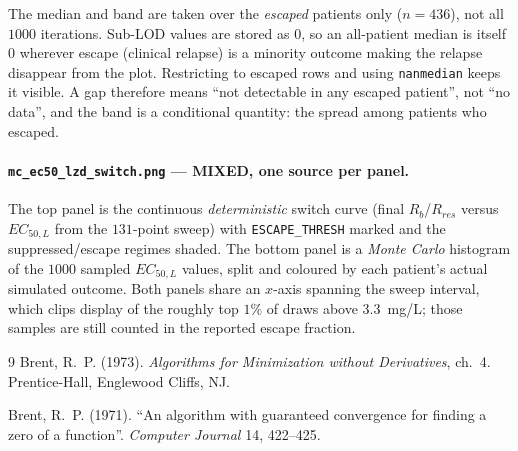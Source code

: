 \documentclass[11pt]{article}
\begin{document}
The median and band are taken over the \emph{escaped} patients only
($n = 436$), not all $1000$ iterations. Sub-LOD values are stored as $0$,
so an all-patient median is itself $0$ wherever escape (clinical relapse) is a minority outcome making the relapse disappear from the plot. Restricting to escaped rows and
using \texttt{nanmedian} keeps it visible. A gap therefore means ``not
detectable in any escaped patient'', not ``no data'', and the band is a
conditional quantity: the spread among patients who escaped.

\paragraph{\texttt{mc\_ec50\_lzd\_switch.png} --- MIXED, one source per
panel.} The top panel is the continuous \emph{deterministic} switch curve
(final $R_b$/$R_{res}$ versus $EC_{50,L}$ from the $131$-point sweep) with
\texttt{ESCAPE\_THRESH} marked and the suppressed/escape regimes shaded.
The bottom panel is a \emph{Monte Carlo} histogram of the $1000$ sampled
$EC_{50,L}$ values, split and coloured by each patient's actual simulated
outcome. Both panels share an $x$-axis spanning the sweep interval, which
clips display of the roughly top $1\%$ of draws above $3.3$~mg/L; those
samples are still counted in the reported escape fraction.

\begin{thebibliography}{9}
Brent, R.~P. (1973). \emph{Algorithms for Minimization without
Derivatives}, ch.~4. Prentice-Hall, Englewood Cliffs, NJ.

Brent, R.~P. (1971). ``An algorithm with guaranteed convergence for
finding a zero of a function''. \emph{Computer Journal} 14, 422--425.
\end{thebibliography}
\end{document}
